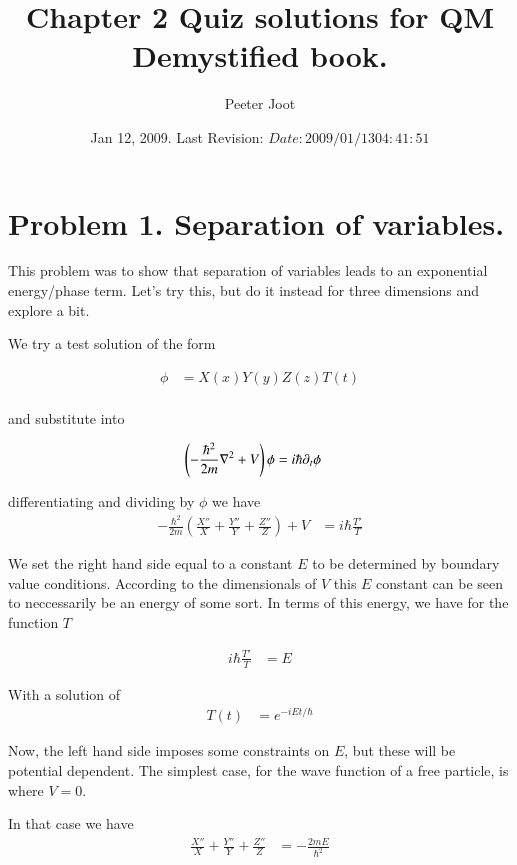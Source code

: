 \documentclass{article}
\title{ Chapter 2 Quiz solutions for QM Demystified book. }
\author{Peeter Joot}
\date{ Jan 12, 2009.  Last Revision: $Date: 2009/01/13 04:41:51 $ }
\begin{document}
\maketitle{}

\section{ Problem 1. Separation of variables. }

This problem was to show that separation of variables leads to an exponential energy/phase
term.  Let's try this, but do it instead for three dimensions and explore a bit.

We try a test solution of the form

\begin{align*}
\phi &= X(x) Y(y) Z(z) T(t) \\
\end{align*}

and substitute into 

\begin{align*}
\left(-\frac{\hbar^2}{2m}\nabla^2 + V\right) \phi &= i \hbar \partial_t \phi
\end{align*}

differentiating and dividing by $\phi$ we have
\begin{align*}
-\frac{\hbar^2}{2m}
\left(
\frac{X''}{X}
+\frac{Y''}{Y}
+\frac{Z''}{Z}
\right)
 + V &= i \hbar \frac{T'}{T}
\end{align*}

We set the right hand side equal to a constant $E$ to be determined by boundary value conditions.
According to the dimensionals of $V$ this $E$ constant can be seen to neccessarily be an energy
of some sort.  In terms of this energy, we have for the function $T$

\begin{align*}
i \hbar \frac{T'}{T} &= E
\end{align*}

With a solution of
\begin{align*}
T(t) &= e^{-i E t/\hbar}
\end{align*}

Now, the left hand side imposes some constraints on $E$, but these will be potential dependent.
The simplest case, for the wave function of a free particle, is where $V=0$.

In that case we have
\begin{align*}
\frac{X''}{X} +\frac{Y''}{Y} +\frac{Z''}{Z} &= - \frac{2 m E}{\hbar^2}
\end{align*}
\end{document}
